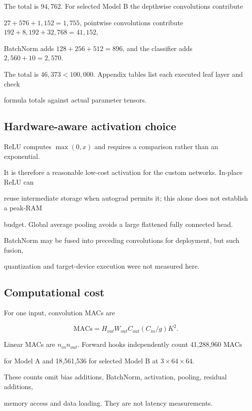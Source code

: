 \documentclass[11pt,a4paper]{article}
\begin{document}
The total is $94,762$. For selected Model B the depthwise convolutions contribute

$27+576+1,152=1,755$, pointwise convolutions contribute $192+8,192+32,768=41,152$,

BatchNorm adds $128+256+512=896$, and the classifier adds $2,560+10=2,570$.

The total is $46,373<100,000$. Appendix tables list each executed leaf layer and check

formula totals against actual parameter tensors.



\subsection{Hardware-aware activation choice}

ReLU computes $\max(0,x)$ and requires a comparison rather than an exponential.

It is therefore a reasonable low-cost activation for the custom networks. In-place ReLU can

reuse intermediate storage when autograd permits it; this alone does not establish a peak-RAM

budget. Global average pooling avoids a large flattened fully connected head.

BatchNorm may be fused into preceding convolutions for deployment, but such fusion,

quantization and target-device execution were not measured here.



\subsection{Computational cost}

For one input, convolution MACs are

\begin{equation}\mathrm{MACs}=H_{out}W_{out}C_{out}(C_{in}/g)K^2.\end{equation}

Linear MACs are $n_{in}n_{out}$. Forward hooks independently count 41,288,960 MACs

for Model A and 18,561,536 for selected Model B at $3\times64\times64$.

These counts omit bias additions, BatchNorm, activation, pooling, residual additions,

memory access and data loading. They are not latency measurements.
\end{document}
